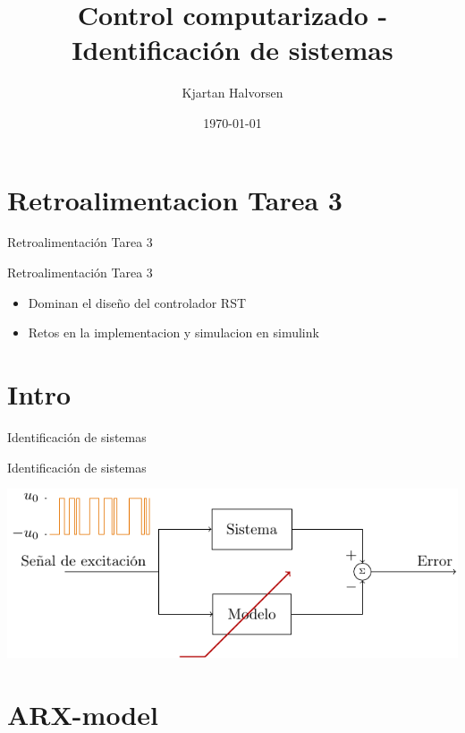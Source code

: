 \documentclass[presentation,aspectratio=169]{beamer}
\author{Kjartan Halvorsen}
\date{\today}
\title{Control computarizado - Identificación de sistemas}
\begin{document}
\maketitle

\section{Retroalimentacion Tarea 3}
\label{sec:orga2def70}

\begin{frame}[label={sec:orgaf70c01}]{Retroalimentación Tarea 3}
\end{frame}

\begin{frame}[label={sec:orgfd031ca}]{Retroalimentación Tarea 3}
\begin{itemize}
\item Dominan el diseño del controlador RST
\item Retos en la implementacion y simulacion en simulink
\end{itemize}
\end{frame}

\section{Intro}
\label{sec:org7d88cfb}
\begin{frame}[label={sec:org5325003}]{Identificación de sistemas}
\end{frame}
\begin{frame}[label={sec:org70fa9a2}]{Identificación de sistemas}
\begin{center}
\includegraphics[]{sysid-graphic} 
\end{center}
\end{frame}

\section{ARX-model}
\label{sec:org5573d50}
\end{document}
